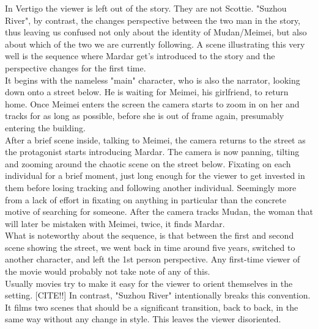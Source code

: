\documentclass[fleqn,14pt]{article}
\begin{document}
In Vertigo the viewer is left out of the story. They are not Scottie. "Suzhou River", by contrast,
the changes perspective between the two man in the story, thus leaving us confused
not only about the identity of Mudan/Meimei, but also about which of the two we are currently following. 
A scene illustrating this very well is the sequence where Mardar get's introduced to the story and the perspective
changes for the first time.
\\ It begins with the nameless "main" character, who is also the narrator, looking down onto
a street below. He is waiting for Meimei, his girlfriend, to return home. Once Meimei enters the screen
the camera starts to zoom in on her and tracks for as long as possible, before she is out of frame again,
presumably entering the building. \\
After a brief scene inside, talking to Meimei, the camera returns to the street as the protagonist starts introducing Mardar. 
The camera is now panning, tilting and zooming around the chaotic scene on the street below.
Fixating on each individual for a brief moment, just long enough for the viewer to get invested
in them before losing tracking and following another individual. Seemingly more from a lack of effort in fixating on anything
in particular than the concrete motive of searching for someone. After the camera tracks Mudan, the woman that will later be
mistaken with Meimei, twice, it finds Mardar. \\
What is noteworthy about the sequence, is that between the first and second scene showing the street, we went back in time 
around five years, switched to another character, and left the 1st person perspective. Any first-time viewer of the movie 
would probably not take note of any of this. \\
Usually movies try to make it easy for the viewer to orient themselves in the setting. [CITE!!]
In contrast, "Suzhou River" intentionally breaks this convention. It films two scenes that should be a significant transition,
back to back, in the same way without any change in style. This leaves the viewer disoriented. \\
\end{document}
